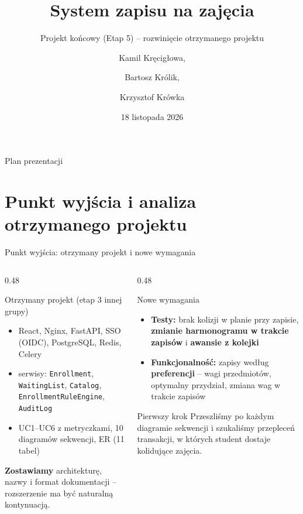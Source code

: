 \documentclass[aspectratio=169, 10pt, xcolor=table]{beamer}
\title[System zapisu na zajęcia]{System zapisu na zajęcia}
\subtitle{Projekt końcowy (Etap 5) -- rozwinięcie otrzymanego projektu}
\author[]{Kamil Kręcigłowa, \and Bartosz Królik, \and Krzysztof Krówka}
\institute[]{}
\date[]{18 listopada 2026}
\begin{document}
\begin{frame}
    \titlepage
\end{frame}

\begin{frame}{Plan prezentacji}
    \footnotesize
    \tableofcontents
\end{frame}

\section{Punkt wyjścia i analiza otrzymanego projektu}

\begin{frame}{Punkt wyjścia: otrzymany projekt i nowe wymagania}
    \footnotesize
    \begin{columns}[T, onlytextwidth]
        \begin{column}{0.48\textwidth}
            \begin{block}{Otrzymany projekt (etap 3 innej grupy)}
                \begin{itemize}
                    \item React, Nginx, FastAPI, SSO (OIDC), PostgreSQL, Redis, Celery
                    \item serwisy: \texttt{Enrollment}, \texttt{WaitingList}, \texttt{Catalog}, \texttt{EnrollmentRuleEngine}, \texttt{AuditLog}
                    \item UC1--UC6 z metryczkami, 10 diagramów sekwencji, ER (11 tabel)
                \end{itemize}
                \textbf{Zostawiamy} architekturę, nazwy i format dokumentacji -- rozszerzenie ma być naturalną kontynuacją.
            \end{block}
        \end{column}
        \begin{column}{0.48\textwidth}
            \begin{exampleblock}{Nowe wymagania}
                \begin{itemize}
                    \item \textbf{Testy:} brak kolizji w planie przy zapisie, \textbf{zmianie harmonogramu w trakcie zapisów} i \textbf{awansie z kolejki}
                    \item \textbf{Funkcjonalność:} zapisy według \textbf{preferencji} -- wagi przedmiotów, optymalny przydział, zmiana wag w trakcie zapisów
                \end{itemize}
            \end{exampleblock}
            \begin{alertblock}{Pierwszy krok}
                Przeszliśmy po każdym diagramie sekwencji i szukaliśmy przepleceń transakcji, w których student dostaje kolidujące zajęcia.
            \end{alertblock}
        \end{column}
    \end{columns}
\end{frame}
\end{document}
